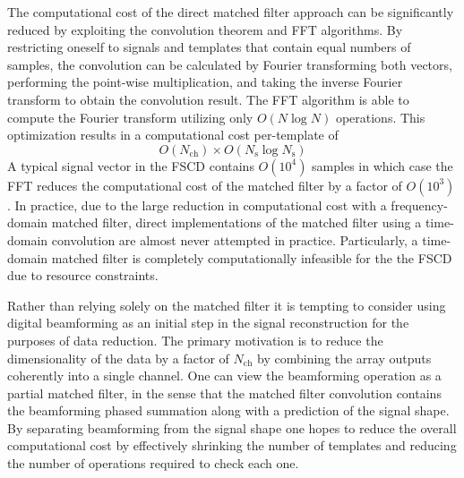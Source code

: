 The computational cost of the direct matched filter approach can be significantly reduced by exploiting the convolution theorem and FFT algorithms. By restricting oneself to signals and templates that contain equal numbers of samples, the convolution can be calculated by Fourier transforming both vectors, performing the point-wise multiplication, and taking the inverse Fourier transform to obtain the convolution result. The FFT algorithm is able to compute the Fourier transform utilizing only $O(N\log{N})$ operations. This optimization results in a computational cost per-template of
\begin{equation}
    O(N_\mathrm{ch})\times O(N_\mathrm{s}\log{N_\mathrm{s}})
\end{equation}
A typical signal vector in the FSCD contains $O(10^4)$ samples in which case the FFT reduces the computational cost of the matched filter by a factor of $O(10^3)$. In practice, due to the large reduction in computational cost with a frequency-domain matched filter, direct implementations of the matched filter using a time-domain convolution are almost never attempted in practice. Particularly, a time-domain matched filter is completely computationally infeasible for the the FSCD due to resource constraints.

Rather than relying solely on the matched filter it is tempting to consider using digital beamforming as an initial step in the signal reconstruction for the purposes of data reduction. The primary motivation is to reduce the dimensionality of the data by a factor of $N_\mathrm{ch}$ by combining the array outputs coherently into a single channel. One can view the beamforming operation as a partial matched filter, in the sense that the matched filter convolution contains the beamforming phased summation along with a prediction of the signal shape. By separating beamforming from the signal shape one hopes to reduce the overall computational cost by effectively shrinking the number of templates and reducing the number of operations required to check each one.

